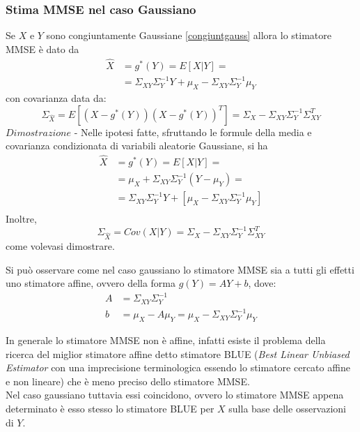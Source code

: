 \subsubsection{Stima MMSE nel caso Gaussiano} 
Se $X$ e $Y$ sono congiuntamente Gaussiane \eqref{congiuntgauss} allora lo stimatore MMSE è dato da
\begin{equation}
\label{mmsex}
\begin{split}
\widehat{X}&=g^*(Y)=E[X|Y]=\\
&=\Sigma_{XY}\Sigma_Y^{-1}Y + \mu_{X}-\Sigma_{XY}\Sigma_Y^{-1}\mu_{Y}
\end{split}
\end{equation}
con covarianza data da:
\begin{equation}
\label{mmsep}
\Sigma_{\widehat{X}}= E[(X-g^*(Y))(X-g^*(Y))^T]=\Sigma_X-\Sigma_{XY}\Sigma_Y^{-1}\Sigma_{XY}^T
\end{equation}
$Dimostrazione $ - Nelle ipotesi fatte, sfruttando le formule della media e covarianza condizionata di variabili aleatorie Gaussiane, si ha
\begin{equation}
\begin{split}
\widehat{X}&=g^*(Y)=E[X|Y]=\\
&=\mu_{X}+ \Sigma_{XY}\Sigma_Y^{-1}(Y-\mu_Y)=\\
&=\Sigma_{XY}\Sigma_Y^{-1}Y+[\mu_{X}-\Sigma_{XY}\Sigma_Y^{-1}\mu_{Y}]\\
\end{split}
\end{equation}
Inoltre,
\begin{equation}
\Sigma_{\widehat{X}}=Cov(X|Y)=\Sigma_X- \Sigma_{XY}\Sigma_Y^{-1}\Sigma_{XY}^T 
\end{equation}
come volevasi dimostrare.

Si può osservare come nel caso gaussiano lo stimatore MMSE sia a tutti gli effetti uno stimatore affine, ovvero della forma $g(Y)=AY+b$, dove:
\begin{align}
A&=\Sigma_{XY}\Sigma_Y^{-1}\\
b&=\mu_{X}-A\mu_{Y}=\mu_{X}-\Sigma_{XY}\Sigma_Y^{-1}\mu_{Y}
\end{align}

In generale lo stimatore MMSE non è affine, infatti esiste il problema della ricerca del miglior stimatore affine detto stimatore BLUE (\emph{Best Linear Unbiased Estimator} con una imprecisione terminologica essendo lo stimatore cercato affine e non lineare) che è meno preciso dello stimatore MMSE.\\
Nel caso gaussiano tuttavia essi coincidono, ovvero lo stimatore MMSE appena determinato è esso stesso lo stimatore BLUE per $X$ sulla base delle osservazioni di $Y$.
\newpage